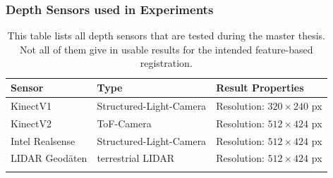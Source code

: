 \subsubsection{Depth Sensors used in Experiments}

\begin{table}
\begin{tabular}{l|l|l}
    Sensor & Type & Result Properties \\
    \hline
    KinectV1 & Structured-Light-Camera & Resolution: $320 \times 240$ px \\
    KinectV2 & \acrshort{ToF}-Camera & Resolution: $512 \times 424$ px \\
    Intel Realsense & Structured-Light-Camera & Resolution: $512 \times 424$ px \\
    LIDAR Geodäten & terrestrial \acrshort{LIDAR} & Resolution: $512 \times 424$ px \\
    \caption[List of tested depth sensors]{This table lists all depth sensors that are tested during the master thesis. Not all of them give in usable results for the intended feature-based registration.}
\end{tabular}
\end{table}
